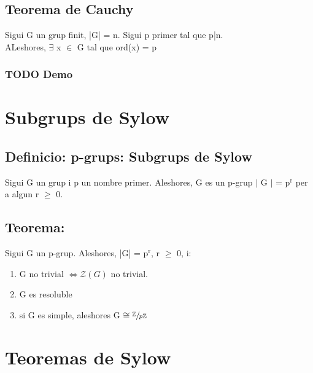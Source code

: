\documentclass[11pt]{article}
\begin{document}
\subsection{Teorema de Cauchy}
\label{sec:org3b809a2}
Sigui G un grup finit, |G| = n. Sigui p primer tal que p|n. \\
ALeshores, \(\exists\) x \(\in\) G tal que ord(x) = p

\subsubsection{{\bfseries\sffamily TODO} Demo}
\label{sec:orgd774f9b}

\section{Subgrups de Sylow}
\label{sec:org45b6535}

\subsection{Definicio: p-grups: Subgrups de Sylow}
\label{sec:org66e33cb}
Sigui G un grup i p un nombre primer. Aleshores,  G es un p-grup \iff \(\vert{}\) G \(\vert{}\) = p\(^{\text{r}}\) per a algun r \(\ge\) 0.

\subsection{Teorema:}
\label{sec:org05b9428}
Sigui G un p-grup. Aleshores, |G| = p\(^{\text{r}}\), r \(\ge\) 0, i:
\begin{enumerate}
\item G no trivial \(\iff \mathcal{Z}(G)\) no trivial.
\item G es resoluble
\item si G es simple, aleshores G \(\cong \sfrac{\mathbb{Z}}{p\mathbb{Z}}\)
\end{enumerate}

\section{Teoremas de Sylow}
\label{sec:org183d4f5}
\end{document}
